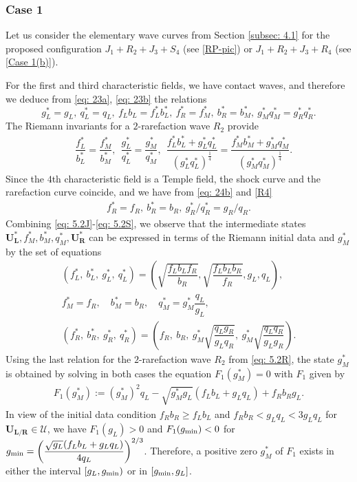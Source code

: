 \documentclass[11pt]{article}
\numberwithin{equation}{section}
\newtheorem{counter example}[theorem]{Counter Example}
\begin{document}
{\subsubsection{Case 1}\label{subsubsec: 5.1.1}
Let us consider the elementary wave curves from Section \ref{subsec: 4.1} for the proposed configuration $J_1+R_2+J_3+S_4$ (see \ref{RP-pic}) or $J_1+R_2+J_3+R_4$ (see \ref{Case 1(b)}).

For the first and third characteristic fields, we have contact waves, and therefore we deduce from \eqref{eq: 23a}, \eqref{eq: 23b} the relations 
\begin{equation}\label{eq: 5.2J}
 g^*_L=g_L,\ q^*_L=q_L,\ f_Lb_L=f^*_Lb^*_L,\
 f^*_R=f_M^*,\ b^*_R=b_M^*,\  g_M^*q_M^*=g^*_Rq^*_R.
\end{equation}
The Riemann invariants for a $2$-rarefaction wave $R_2$ provide
\begin{align}\label{eq: 5.2R}
& \ \dfrac{f_L^*}{b_L^*}=\dfrac{f_M^*}{b_M^*},~\ \dfrac{g_L^*}{q_L^*}=\dfrac{g_M^*}{q_M^*}, ~\ \dfrac{f_L^* b_L^* +g_L^* q_L^*}{\left(g_L^* q_L^*\right)^{\frac 14}}=\dfrac{f_M^* b_M^* +g_M^* q_M^*}{\left(g_M^* q_M^*\right)^{\frac 14}}.
\end{align}
Since the $4$th characteristic field is a Temple field, the shock curve and the rarefaction curve coincide, and we have from \eqref{eq: 24b} and \eqref{R4}
\begin{align}\label{eq: 5.2S}
f_R^*=f_R,~b_R^*=b_R,~g_R^*/q_R^*=g_R/q_R.
\end{align}
Combining \eqref{eq: 5.2J}-\eqref{eq: 5.2S}, we observe that the intermediate states 
$\mathbf{U_L^*}, f^*_M, b^*_M, q^*_M, \mathbf{U_R^*} $ can be expressed in terms of the Riemann initial data and $g^*_M$ by the set of equations 
\begin{equation}\label{case 1 relations}
\begin{array}{c}
(f_L^*,~b_L^*,~g_L^*,~q_L^*)=\left(\sqrt{\dfrac{f_Lb_Lf_R}{b_R}}, \sqrt{\dfrac{f_Lb_Lb_R}{f_R}}, g_L, q_L\right),\\
    f_M^* = f_R,  \quad  b_M^* = b_R, \quad  q_M^*=g_M^* \dfrac{q_L}{g_L}, \\
    (f_R^*,~b_R^*,~g_R^*,~q_R^*)=\left(f_R,~ b_R, ~g_M^*\sqrt{\dfrac{q_Lg_R}{g_Lq_R}},~g_M^* \sqrt{\dfrac{q_Lq_R}{g_Lg_R}}\right).%
\end{array}
\end{equation}
Using the last relation for the $2$-rarefaction wave $R_2$ from \eqref{eq: 5.2R}, the state $g_M^*$ is  obtained by solving  in both cases the equation  $F_1(g_M^*) =0$ with $F_1$ given by 
\begin{align}\label{eq: 5.2}
  F_1(g_M^*):= (g^*_M)^2 q_L-\sqrt{g_M^* g_L}(f_L b_L+g_Lq_L)+f_R b_Rg_L.
\end{align}
In view of the initial data condition $f_Rb_R\geq f_Lb_L$ and $f_Rb_R<g_Lq_L<3g_Lq_L$ for $\mathbf{U_{L/R}}\in \mathcal{U}$, we have $F_1(g_L)>0$ and $F
_1(g_{\rm{min}})<0$ for $g_{\rm{min}}=\left(\dfrac{\sqrt{g_L}(f_Lb_L+g_Lq_L)}{4q_L}\right)^{2/3}$. 
Therefore, a positive zero $g_M^*$ of $F_1$ exists in  either the interval $[g_L, g_{\rm{min}})$ or  in $[g_{\rm{min}}, g_L]$.

}
\end{document}
